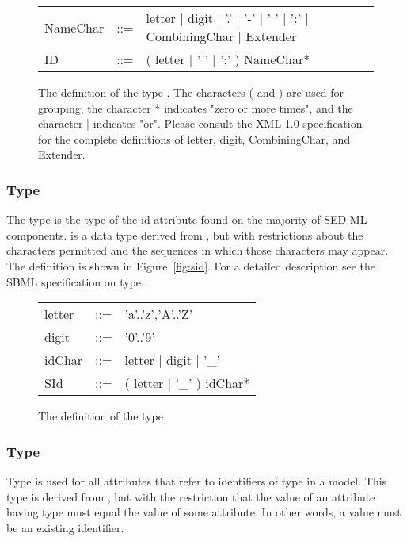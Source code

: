 \begin{figure}[hbt]
  \ttfamily
  \small
  \centering
  \begin{tabular}{lll}
    NameChar & ::= & letter | digit | '.' | '-' | ' ' | ':' | CombiningChar | Extender\\
    ID    & ::= & ( letter | ' ' | ':' ) NameChar*\\
  \end{tabular}
  \vspace*{-1ex}
  \caption{The definition of the type . The characters ( and ) are used for grouping, the character * indicates "zero or more times", and the character | indicates "or". Please consult the XML 1.0 specification for the complete definitions of letter, digit, CombiningChar, and Extender.}
  \label{fig:id}
\end{figure}

\subsubsection[\element{SId}]{Type }
\label{type:sid}
The type  is the type of the id attribute found on the majority of SED-ML components.  is a data type derived from , but with restrictions about the characters permitted and the sequences in which those characters may appear. The definition is shown in Figure~\vref{fig:sid}. For a detailed description see the SBML specification on type  \citep{HBH+10}.

\begin{figure}[hbt]
  \ttfamily
  \small
  \centering
  \begin{tabular}{lll}
    letter & ::= & 'a'..'z','A'..'Z'\\
    digit  & ::= & '0'..'9'\\
    idChar & ::= & letter | digit | '\_'\\
    SId    & ::= & ( letter | '\_' ) idChar*\\
  \end{tabular}
  \vspace*{-1ex}
  \caption{The definition of the type }
  \label{fig:sid}
\end{figure}

\subsubsection[\element{SIdRef}]{Type }
\label{type:sidref}
Type  is used for all attributes that refer to identifiers of type \hyperref[type:sid]{} in a model. This type is derived from \hyperref[type:sid]{}, but with the restriction that the value of an attribute having type  must equal the value of some \hyperref[type:sid]{} attribute. In other words, a  value must be an existing identifier.

